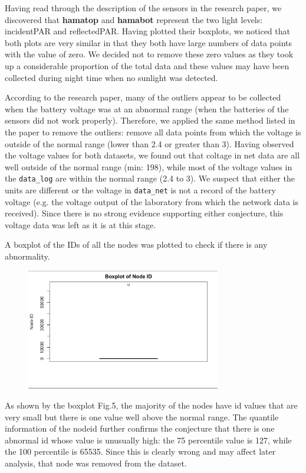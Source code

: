 \documentclass[twocolumn,11pt]{asme2ej}
\begin{document}
Having read through the description of the sensors in the research paper, we discovered that \textbf{hamatop} and \textbf{hamabot} represent the two light levels: incidentPAR and reflectedPAR. Having plotted their boxplots, we noticed that both plots are very similar in that they both have large numbers of data points with the value of zero. We decided not to remove these zero values as they took up a considerable proportion of the total data and these values may have been collected during night time when no sunlight was detected.

According to the research paper, many of the outliers appear to be collected when the battery voltage was at an abnormal range (when the batteries of the sensors did not work properly). Therefore, we applied the same method listed in the paper to remove the outliers: remove all data points from which the voltage is outside of the normal range (lower than 2.4 or greater than 3). Having observed the voltage values for both datasets, we found out that coltage in net data are all well outside of the normal range (min: 198), while most of the voltage values in the \texttt{data\_log} are within the normal range (2.4 to 3). We suspect that either the units are different or the voltage in \texttt{data\_net} is not a record of the battery voltage (e.g. the voltage output of the laboratory from which the network data is received). Since there is no strong evidence supporting either conjecture, this voltage data was left as it is at this stage.

A boxplot of the IDs of all the nodes was plotted to check if there is any abnormality. 

\begin{figure}
    \centering
    \includegraphics[width=85mm]{2e.png} 
    \caption{}
    \label{fig:2e}
\end{figure}


As shown by the boxplot Fig.5, the majority of the nodes have id values that are very small but there is one value well above the normal range. The quantile information of the nodeid further confirms the conjecture that there is one abnormal id whose value is unusually high: the 75 percentile value is 127, while the 100 percentile is 65535. Since this is clearly wrong and may affect later analysis, that node was removed from the dataset.
\end{document}
